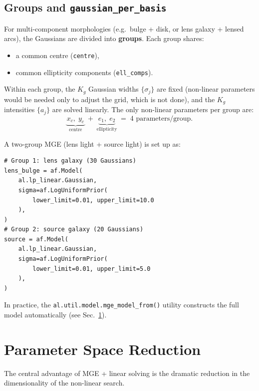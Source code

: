\documentclass[11pt, letterpaper]{article}
\begin{document}
\subsection{Groups and \texttt{gaussian\_per\_basis}}

For multi-component morphologies (e.g.\ bulge + disk, or lens galaxy +
lensed arcs), the Gaussians are divided into \textbf{groups}.  Each
group shares:
\begin{itemize}[nosep]
  \item a common centre (\texttt{centre}),
  \item common ellipticity components (\texttt{ell\_comps}).
\end{itemize}

Within each group, the $K_g$ Gaussian widths $\{\sigma_j\}$ are fixed
(non-linear parameters would be needed only to adjust the grid, which
is not done), and the $K_g$ intensities $\{a_j\}$ are solved linearly.
The only non-linear parameters per group are:
\[
  \underbrace{x_c,\; y_c}_{\text{centre}} \;+\;
  \underbrace{e_1,\; e_2}_{\text{ellipticity}}
  \;=\; 4 \text{ parameters/group.}
\]

\begin{pythonbox}
A two-group MGE (lens light + source light) is set up as:
\begin{lstlisting}
# Group 1: lens galaxy (30 Gaussians)
lens_bulge = af.Model(
    al.lp_linear.Gaussian,
    sigma=af.LogUniformPrior(
        lower_limit=0.01, upper_limit=10.0
    ),
)
# Group 2: source galaxy (20 Gaussians)
source = af.Model(
    al.lp_linear.Gaussian,
    sigma=af.LogUniformPrior(
        lower_limit=0.01, upper_limit=5.0
    ),
)
\end{lstlisting}
In practice, the \texttt{al.util.model.mge\_model\_from()} utility
constructs the full model automatically (see Sec.~\ref{sec:reduction}).
\end{pythonbox}

\section{Parameter Space Reduction}
\label{sec:reduction}

The central advantage of MGE + linear solving is the dramatic reduction
in the dimensionality of the non-linear search.
\end{document}

